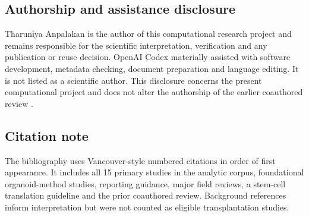 \documentclass[11pt,a4paper]{article}
\begin{document}
\subsection*{Authorship and assistance disclosure}

Tharuniya Anpalakan is the author of this computational research project and remains responsible for the scientific interpretation, verification and any publication or reuse decision. OpenAI Codex materially assisted with software development, metadata checking, document preparation and language editing. It is not listed as a scientific author. This disclosure concerns the present computational project and does not alter the authorship of the earlier coauthored review \citep{sandamini2025}.

\subsection*{Citation note}

The bibliography uses Vancouver-style numbered citations in order of first appearance. It includes all 15 primary studies in the analytic corpus, foundational organoid-method studies, reporting guidance, major field reviews, a stem-cell translation guideline and the prior coauthored review. Background references inform interpretation but were not counted as eligible transplantation studies.

\clearpage


\end{document}
